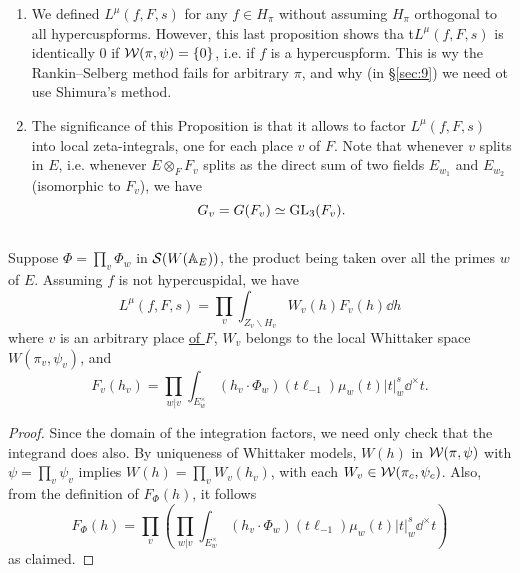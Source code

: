 \begin{remark*}
\begin{enumerate}[label=(\roman*)]
    \item We defined $L^\mu(f, F, s)$ for any $f \in H_\pi$ without assuming $H_\pi$ orthogonal to all hypercuspforms.
    However, this last proposition shows tha t$L^\mu(f, F, s)$ is identically $0$ if $\mathcal{W}(\pi, \psi) =\{0\}$, i.e. if $f$ is a hypercuspform.
    This is wy the Rankin--Selberg method fails for arbitrary $\pi$, and why (in \S \ref{sec:9}) we need ot use Shimura's method.
    \item The significance of this Proposition is that it allows to factor $L^\mu(f, F, s)$ into local zeta-integrals, one for each place $v$ of $F$.
    Note that whenever $v$ splits in $E$, i.e. whenever $E\otimes_F F_v$ splits as the direct sum of two fields $E_{w_1}$ and $E_{w_2}$ (isomorphic to $F_v$), we have
    \[
        G_v = G(F_v) \simeq \mathrm{GL}_3(F_v).
    \]
\end{enumerate} 
\end{remark*}


\subsection{}
\label{sec:3.6}
\begin{proposition}
\label{prop:3.6}
Suppose $\Phi = \prod_v \Phi_w$ in $\mathcal{S}(W(\mathbb{A}_E))$, the product being taken over all the primes $w$ of $E$.
Assuming $f$ is not hypercuspidal, we have
\[
    L^\mu(f, F, s) = \prod_v \int_{Z_v \backslash H_v} W_v(h) F_v(h) \dd h
\]
where $v$ is an arbitrary place \underline{of $F$}, $W_v$ belongs to the local Whittaker space $W(\pi_v, \psi_v)$, and
\[
    F_v(h_v) = \prod_{w|v} \int_{E_w^\times} (h_v \cdot \Phi_w) (t \ell_{-1}) \mu_w(t) |t|_w^{s} \dd^\times t.
\]
\end{proposition}
\begin{proof}
Since the domain of the integration factors, we need only check that the integrand does also.
By uniqueness of Whittaker models, $W(h)$ in $\mathcal{W}(\pi, \psi)$ with $\psi =\prod_v \psi_v$ implies $W(h) = \prod_v W_v(h_v)$, with each $W_v \in\mathcal{W}(\pi_c, \psi_c)$.
Also, from the definition of $F_\Phi(h)$, it follows
\[
    F_\Phi(h) = \prod_v \left(\prod_{w|v} \int_{E_w^\times} (h_v \cdot \Phi_w) (t \ell_{-1}) \mu_w(t) |t|^{s}_w \dd^\times t\right)
\]
as claimed.
\end{proof}


\subsection{}
\label{sec:3.7}

